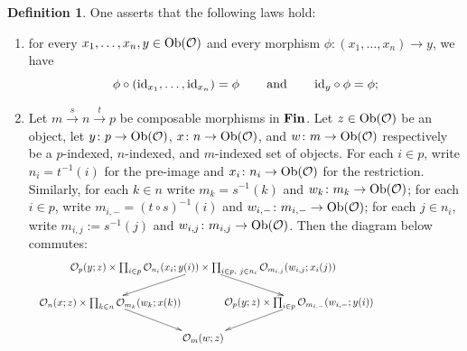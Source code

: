\documentclass{book}
\def\tn{\textnormal}
\def\mc{\mathcal}
\def\Ob{\tn{Ob}}
\def\hsp{\hspace{.3in}}
\def\to{\rightarrow}
\def\taking{\colon}
\def\m1{{-1}}
\newcommand{\To}[1]{\xrightarrow{#1}}
\def\id{\tn{id}}
\def\mcO{\mc{O}}
\theoremstyle{remark}
\theoremstyle{definition}
\newtheorem{definition}[subsubsection]{Definition}
\def\Fin{{\bf Fin}}
\begin{document}
\begin{definition}
One asserts that the following laws hold:
\begin{enumerate}[\hsp 1.]
\item for every $x_1,\ldots,x_n,y\in\Ob(\mcO)$ and every morphism $\phi\taking(x_1,\ldots,x_n)\to y$, we have
$$\phi\circ(\id_{x_1},\ldots,\id_{x_n})=\phi\hsp\tn{and}\hsp\id_y\circ\phi=\phi;$$
\item Let $m\To{s}n\To{t}p$ be composable morphisms in $\Fin$. Let $z\in\Ob(\mcO)$ be an object, let $y\taking p\to\Ob(\mcO)$, $x\taking n\to\Ob(\mcO)$, and $w\taking m\to\Ob(\mcO)$ respectively be a $p$-indexed, $n$-indexed, and $m$-indexed set of objects. For each $i\in p$, write $n_i=t^\m1(i)$ for the pre-image and $x_i\taking n_i\to\Ob(\mcO)$ for the restriction. Similarly, for each $k\in n$ write $m_k=s^\m1(k)$ and $w_k\taking m_k\to\Ob(\mcO)$; for each $i\in p$, write $m_{i,-}=(t\circ s)^\m1(i)$ and $w_{i,-}\taking m_{i,-}\to\Ob(\mcO)$; for each $j\in n_i$, write $m_{i,j}:=s^\m1(j)$ and $w_{i,j}\taking m_{i,j}\to\Ob(\mcO)$. Then the diagram below commutes:
$$\hspace{-1.4in}\xymatrix@=18pt{
&
{\hspace{.9in}\color{white}\prod\color{black}}
\save[]+<0cm,0cm>*\txt<30pc>{$
\mcO_p(y;z)\times\prod_{i\in p}\mcO_{n_i}(x_i;y(i))\times\prod_{i\in p,\ j\in n_i}\mcO_{m_{i,j}}(w_{i,j};x_i(j))
$}
\ar[rd]\ar[ld]
\restore\\
{\hspace{1in}\color{white}\prod\color{black}}
\save[]+<.4cm,0cm>*\txt<30pc>{$
\mcO_n(x;z)\times\prod_{k\in n}\mcO_{m_k}(w_k;x(k))
$}
\ar[dr]
\restore&&
{\hspace{1in}\color{white}\prod\color{black}}
\save[]+<-.3cm,0cm>*\txt<30pc>{$
\mcO_p(y;z)\times\prod_{i\in p}\mcO_{m_{i,-}}(w_{i,-};y(i))
$}
\ar[dl]
\restore\\
&\mcO_m(w;z)
}
$$

\end{enumerate}

\end{definition}
\end{document}
